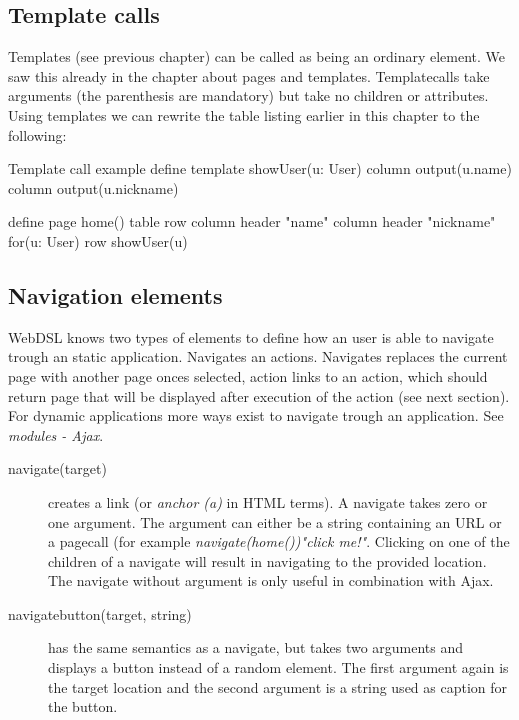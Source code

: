 \subsection{Template calls}
Templates (see previous chapter) can be called as being an ordinary element. We saw this already in the chapter about pages and templates. Templatecalls take arguments (the parenthesis are mandatory) but take no children or attributes. Using templates we can rewrite the table listing earlier in this chapter to the following:
\begin{webdsl}{Template call example}
define template showUser(u: User) { 
	column { output(u.name) } 
	column { output(u.nickname) }
}

define page home() {
	table {
		row { column { header { "name" } } column { header { "nickname" } } }
		for(u: User) {
			row { showUser(u) }
		}
	}
}
\end{webdsl}

\subsection{Navigation elements}
WebDSL knows two types of elements to define how an user is able to navigate trough an static application. Navigates an actions. Navigates replaces the current page with another page onces selected, action links to an action, which should return page that will be displayed after execution of the action (see next section). For dynamic applications more ways exist to navigate trough an application. See \emph{modules - Ajax}. 
\begin{description}
	\item[navigate(target){}] creates a link (or \emph{anchor (a)} in HTML terms). A navigate takes zero or one argument. The argument can either be a string containing an URL or a pagecall (for example \emph{navigate(home()){"click me!"}}. Clicking on one of the children of a navigate will result in navigating to the provided location. The navigate without argument is only useful in combination with Ajax. 
	\item[navigatebutton(target, string)] has the same semantics as a navigate, but takes two arguments and displays a button instead of a random element. The first argument again is the target location and the second argument is a string used as caption for the button. 
\end{description}

